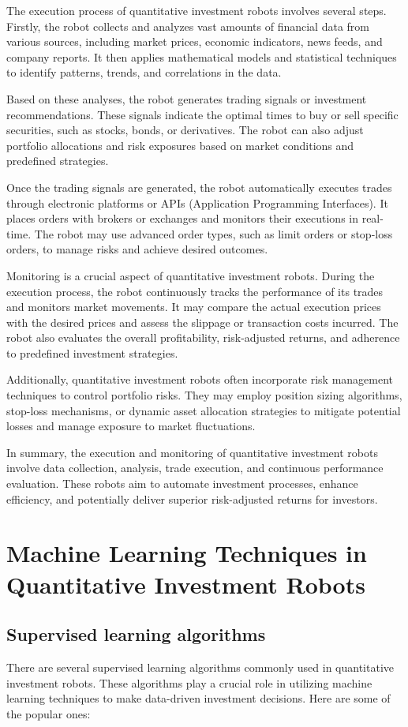\documentclass[UTF8]{ctexart}
\begin{document}
The execution process of quantitative investment robots involves several steps. Firstly, the robot collects and analyzes vast amounts of financial data from various sources, including market prices, economic indicators, news feeds, and company reports. It then applies mathematical models and statistical techniques to identify patterns, trends, and correlations in the data.

Based on these analyses, the robot generates trading signals or investment recommendations. These signals indicate the optimal times to buy or sell specific securities, such as stocks, bonds, or derivatives. The robot can also adjust portfolio allocations and risk exposures based on market conditions and predefined strategies.

Once the trading signals are generated, the robot automatically executes trades through electronic platforms or APIs (Application Programming Interfaces). It places orders with brokers or exchanges and monitors their executions in real-time. The robot may use advanced order types, such as limit orders or stop-loss orders, to manage risks and achieve desired outcomes.

Monitoring is a crucial aspect of quantitative investment robots. During the execution process, the robot continuously tracks the performance of its trades and monitors market movements. It may compare the actual execution prices with the desired prices and assess the slippage or transaction costs incurred. The robot also evaluates the overall profitability, risk-adjusted returns, and adherence to predefined investment strategies.

Additionally, quantitative investment robots often incorporate risk management techniques to control portfolio risks. They may employ position sizing algorithms, stop-loss mechanisms, or dynamic asset allocation strategies to mitigate potential losses and manage exposure to market fluctuations.

In summary, the execution and monitoring of quantitative investment robots involve data collection, analysis, trade execution, and continuous performance evaluation. These robots aim to automate investment processes, enhance efficiency, and potentially deliver superior risk-adjusted returns for investors.

\section{Machine Learning Techniques in Quantitative Investment Robots}
\subsection{Supervised learning algorithms}
There are several supervised learning algorithms commonly used in quantitative investment robots. These algorithms play a crucial role in utilizing machine learning techniques to make data-driven investment decisions. Here are some of the popular ones:
\end{document}
